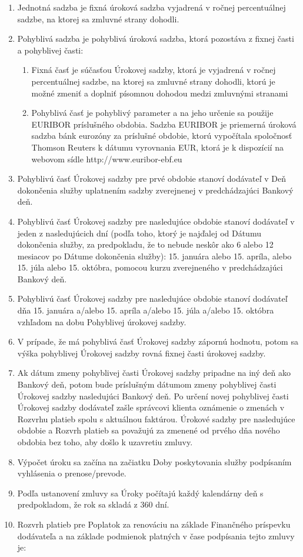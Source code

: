 \begin{enumerate}[label=\arabic*.]
	\item Jednotná sadzba je fixná úroková sadzba vyjadrená v ročnej percentuálnej sadzbe, na ktorej sa zmluvné strany dohodli.
	\item Pohyblivá sadzba je pohyblivá úroková sadzba, ktorá pozostáva z fixnej časti a pohyblivej časti:
	\begin{enumerate}
		\item Fixná časť je súčasťou Úrokovej sadzby, ktorá je vyjadrená v ročnej percentuálnej sadzbe, na ktorej sa zmluvné strany dohodli, ktorú je možné zmeniť a doplniť písomnou dohodou medzi zmluvnými stranami
		\item Pohyblivá časť je pohyblivý parameter a na jeho určenie sa použije EURIBOR príslušného obdobia. Sadzba EURIBOR je priemerná úroková sadzba bánk eurozóny za príslušné obdobie, ktorú vypočítala spoločnosť Thomson Reuters k dátumu vyrovnania EUR, ktorá je k dispozícií na webovom sídle http://www.euribor-ebf.eu
	\end{enumerate}
	\item Pohyblivú časť Úrokovej sadzby pre prvé obdobie stanoví dodávateľ v Deň dokončenia služby uplatnením sadzby zverejnenej v predchádzajúci Bankový deň. 
	\item Pohyblivú časť Úrokovej sadzby pre nasledujúce obdobie stanoví dodávateľ v jeden z nasledujúcich dní (podľa toho, ktorý je najďalej od Dátumu dokončenia služby, za predpokladu, že to nebude neskôr ako 6 alebo 12 mesiacov po Dátume dokončenia služby): 15. januára alebo 15. apríla, alebo 15. júla alebo 15. októbra, pomocou kurzu zverejneného v predchádzajúci Bankový deň. 
	\item Pohyblivú časť Úrokovej sadzby pre nasledujúce obdobie stanoví dodávateľ dňa 15. januára a/alebo 15. apríla a/alebo 15. júla a/alebo 15. októbra vzhľadom na dobu Pohyblivej úrokovej sadzby.
	\item V prípade, že má pohyblivá časť Úrokovej sadzby zápornú hodnotu, potom sa výška pohyblivej Úrokovej sadzby rovná fixnej časti úrokovej sadzby.
	\item Ak dátum zmeny pohyblivej časti Úrokovej sadzby pripadne na iný deň ako Bankový deň, potom bude príslušným dátumom zmeny pohyblivej časti Úrokovej sadzby nasledujúci Bankový deň. Po určení novej pohyblivej časti Úrokovej sadzby dodávateľ zašle správcovi klienta oznámenie o zmenách v Rozvrhu platieb spolu s aktuálnou faktúrou. Úrokové sadzby pre nasledujúce obdobie a Rozvrh platieb  sa považujú za zmenené od prvého dňa nového obdobia bez toho, aby došlo k uzavretiu zmluvy.
	\item Výpočet úroku sa začína na začiatku Doby poskytovania služby podpísaním vyhlásenia o prenose/prevode. 
	\item Podľa ustanovení zmluvy sa Úroky počítajú každý kalendárny deň s predpokladom, že rok sa skladá z 360 dní.
	\item Rozvrh platieb  pre Poplatok za renováciu na základe Finančného príspevku dodávateľa a na základe podmienok platných v čase podpísania tejto zmluvy je:
	

\end{enumerate}
